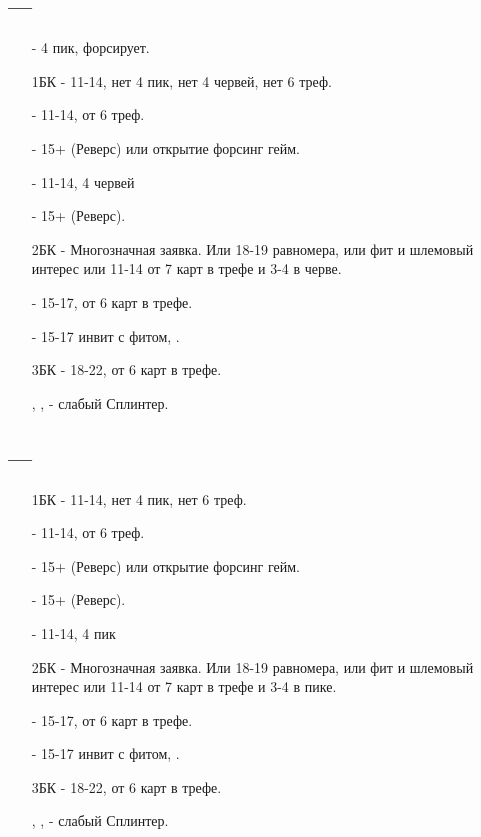 \documentclass{article}
\begin{document}
\subsection{ --- }
\begin{enumerate}
    \item[\sp{1}] - 4 пик, форсирует.
    \item[1БК] - 11-14, нет 4 пик, нет 4 червей, нет 6 треф.
    \item[\cl{2}] - 11-14, от 6 треф.
    \item[\di{2}] - 15+  (Реверс) или открытие форсинг гейм.
    \item[\he{2}] - 11-14, 4 червей
    \item[\sp{2}] - 15+  (Реверс).
    \item[2БК] - Многозначная заявка. Или 18-19 равномера, или фит и шлемовый интерес или 11-14 от 7 карт в трефе и 3-4 в черве.
    \item[\cl{3}] - 15-17, от 6 карт в трефе.
    \item[\he{3}] - 15-17 инвит с фитом, .
    \item[3БК] - 18-22, от 6 карт в трефе.
    \item[\sp{3}, \cl{4}, \di{4}] - слабый Сплинтер.
\end{enumerate}
\subsection{ --- }
\begin{enumerate}
    \item[1БК] - 11-14, нет 4 пик, нет 6 треф.
    \item[\cl{2}] - 11-14, от 6 треф.
    \item[\di{2}] - 15+  (Реверс) или открытие форсинг гейм.
    \item[\he{2}] - 15+  (Реверс).
    \item[\sp{2}] - 11-14, 4 пик
    \item[2БК] - Многозначная заявка. Или 18-19 равномера, или фит и шлемовый интерес или 11-14 от 7 карт в трефе и 3-4 в пике.
    \item[\cl{3}] - 15-17, от 6 карт в трефе.
    \item[\sp{3}] - 15-17 инвит с фитом, .
    \item[3БК] - 18-22, от 6 карт в трефе.
    \item[\cl{4}, \di{4}, \he{4}] - слабый Сплинтер.
\end{enumerate}
\end{document}
